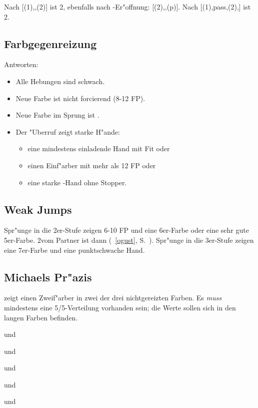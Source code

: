 Nach [(1\of){}\sep\kontra{}\sep(2\of)] ist 2\SA {},
ebenfalls
nach -Er"offnung: [(2\of){}\sep\kontra{}\sep(p)].
Nach [(1\of)\sep{}pass\sep{}(2\of)\sep{}\kontra{}] ist 2\SA {}.

\subsection{Farbgegenreizung}

Antworten:
\begin{itemize}
\item Alle Hebungen sind schwach.
\item Neue Farbe ist nicht forcierend (8-12 FP).
\item Neue Farbe im Sprung ist .
\item Der "Uberruf zeigt starke H"ande:
  \begin{itemize}
  \item eine mindestens einladende Hand mit Fit oder
  \item einen Einf"arber mit mehr als 12 FP oder
  \item eine starke \sa-Hand ohne Stopper.
  \end{itemize}
\end{itemize}

\subsection{Weak Jumps}

Spr"unge in die 2er-Stufe zeigen 6-10 FP und eine 6er-Farbe oder eine sehr gute
5er-Farbe. 2\SA vom Partner ist dann  (\ra~\ref{ogust},
S.~\pageref{ogust}).
Spr"unge in die 3er-Stufe zeigen eine 7\pl{}er-Farbe und eine punktschwache
Hand.

\subsection{Michaels Pr"azis}

 zeigt einen Zweif"arber in zwei der drei
nichtgereizten Farben.  Es \emph{muss} mindestens eine 5/5-Verteilung
vorhanden sein; die Werte sollen sich in den langen Farben befinden.
%
\bdsc
\item[(1\uf){}\sep2\kar] \co und \pi
\item[(1\uf){}\sep2\SA] \co und \aufa {}
\item[(1\of){}\sep2\of] \aofa und \tr
\item[(1\of){}\sep2\SA] \tr und \ka {}
\item[(1\of){}\sep3\tre] \aofa und \ka
\edsc

